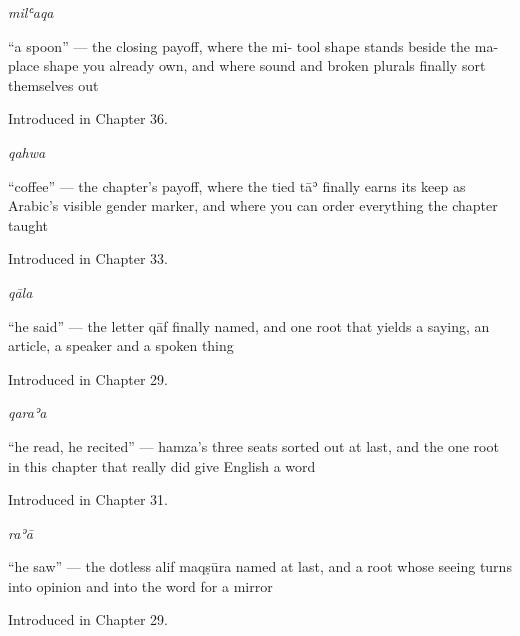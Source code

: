 \noindent\begin{minipage}[t]{\linewidth}
\raggedright
\textbf{}\enspace\emph{milʿaqa}\par
\small \textquotedblleft{}a spoon\textquotedblright{} — the closing payoff, where the mi- tool shape stands beside the ma- place shape you already own, and where sound and broken plurals finally sort themselves out\par
\footnotesize Introduced in Chapter 36.
\end{minipage}\par\medskip

\noindent\begin{minipage}[t]{\linewidth}
\raggedright
\textbf{}\enspace\emph{qahwa}\par
\small \textquotedblleft{}coffee\textquotedblright{} — the chapter's payoff, where the tied tāʾ finally earns its keep as Arabic's visible gender marker, and where you can order everything the chapter taught\par
\footnotesize Introduced in Chapter 33.
\end{minipage}\par\medskip

\noindent\begin{minipage}[t]{\linewidth}
\raggedright
\textbf{}\enspace\emph{qāla}\par
\small \textquotedblleft{}he said\textquotedblright{} — the letter qāf finally named, and one root that yields a saying, an article, a speaker and a spoken thing\par
\footnotesize Introduced in Chapter 29.
\end{minipage}\par\medskip

\noindent\begin{minipage}[t]{\linewidth}
\raggedright
\textbf{}\enspace\emph{qaraʾa}\par
\small \textquotedblleft{}he read, he recited\textquotedblright{} — hamza's three seats sorted out at last, and the one root in this chapter that really did give English a word\par
\footnotesize Introduced in Chapter 31.
\end{minipage}\par\medskip

\noindent\begin{minipage}[t]{\linewidth}
\raggedright
\textbf{}\enspace\emph{raʾā}\par
\small \textquotedblleft{}he saw\textquotedblright{} — the dotless alif maqṣūra named at last, and a root whose seeing turns into opinion and into the word for a mirror\par
\footnotesize Introduced in Chapter 29.
\end{minipage}\par\medskip

